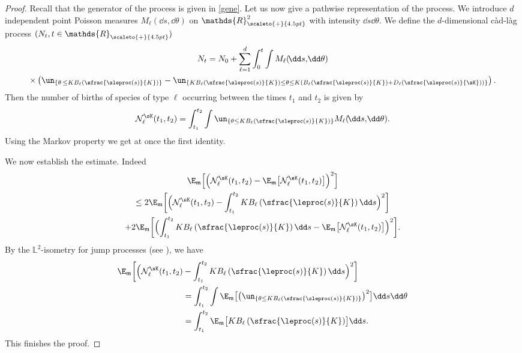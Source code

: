 \begin{proof}
Recall that the generator of the process is given in \eqref{gene}. Let us now give a pathwise representation of the process. We introduce $d$
independent point Poisson measures $M_{\ell}(\!\dd s, \!\dd\theta)$ on $\mathds{R}_{\scaleto{+}{4.5pt}}^{2}$ with intensity
$\dd s \dd\theta$. We define the $d$-dimensional càd-làg process $(N_{t}, t\in\mathds{R}_{\scaleto{+}{4.5pt}})$
\begin{multline*}
N_{t} = N_{0} + \sum_{\ell = 1}^d \int_{0}^t \int M_{\ell}(\!\dd s,\! \dd\theta) \\
\times \left(\un_{\left\{\theta\,\leq K B_{\ell}\left(\sfrac{\sleproc(s)}{K}\right)\right\}} -
\un_{\left\{K B_{\ell}\left(\sfrac{\sleproc(s)}{K}\right)\leq \theta\leq K \left(B_{\ell}\left(\sfrac{\sleproc(s)}{K}\right) +
D_{\ell}\left(\sfrac{\sleproc(s)}{\sK}\right)\right)\right\}} \right) .
\end{multline*}
Then the number of births of species of type $\ell$ occurring between the times $t_{1}$ and $t_{2}$ is given by
\[
\mathcal{N}^{\sK}_\ell(t_{1},t_{2}) = \int_{t_{1}}^{t_{2}} \int \un_{\left\{\theta\leq K B_{\ell}\left(\sfrac{\sleproc(s)}{K}\right)\right\}}
M_{\ell}(\!\dd s, \!\dd\theta).
\]
Using the Markov property we get at once the first identity.

We now establish the estimate. Indeed
\begin{multline*}
\E_{\mathfrak{m}}\Bigl[\Bigl(\mathcal{N}^{\sK}_\ell(t_{1},t_{2}) - \E_{\mathfrak{m}}\bigl[\mathcal{N}^{\sK}_\ell(t_{1},t_{2})\bigr]\Bigr)^2\Bigr]
\\
\leq 2\E_{\mathfrak{m}}\biggl[\Bigl(\mathcal{N}^{\sK}_\ell(t_{1},t_{2}) - \int_{t_{1}}^{t_{2}}
K B_{\ell}\left(\sfrac{\leproc(s)}{K}\right) \dd s\Bigr)^2\biggr]\\
+ 2\E_{\mathfrak{m}}\biggl[\Bigl(\int_{t_{1}}^{t_{2}} K B_{\ell}\left(\sfrac{\leproc(s)}{K}\right) \dd s -
\E_{\mathfrak{m}}\bigl[\mathcal{N}^{\sK}_\ell(t_{1},t_{2})\bigr] \Bigr)^2 \biggr].
\end{multline*}
By the $\mathds{L}^2$-isometry for jump processes (see \cite[(3.9) p.\,62]{Ikeda}), we have
\begin{align*}
\E_{\mathfrak{m}}\biggl[\Bigl(\mathcal{N}^{\sK}_\ell(t_{1},t_{2}) &- \int_{t_{1}}^{t_{2}} K B_{\ell}\left(\sfrac{\leproc(s)}{K}\right) \dd s\Bigr)^2\biggr]\\
&= \int_{t_{1}}^{t_{2}} \int \E_{\mathfrak{m}}\bigl[\bigl(\un_{\left\{\theta\leq K B_{\ell}(\sfrac{\sleproc(s)}{K})\right\}}\bigr)^2 \bigr]\dd s \dd \theta \\
&= \int_{t_{1}}^{t_{2}} \E_{\mathfrak{m}}\bigl[K B_{\ell}\left(\sfrac{\leproc(s)}{K}\right) \bigr]\dd s.
\end{align*}
This finishes the proof.
\end{proof}


